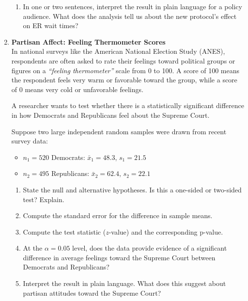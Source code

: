 \documentclass{article}
\begin{document}
\begin{enumerate}
\begin{enumerate}[label=(\alph*)]
          \item In one or two sentences, interpret the result in plain language for a policy audience. What does the analysis tell us about the new protocol’s effect on ER wait times?
        \end{enumerate}
        
\item \textbf{Partisan Affect: Feeling Thermometer Scores} \\[0.5em]
    In national surveys like the American National Election Study (ANES), respondents are often asked to rate their feelings toward political groups or figures on a \emph{“feeling thermometer”} scale from 0 to 100. A score of 100 means the respondent feels very warm or favorable toward the group, while a score of 0 means very cold or unfavorable feelings.
    
    A researcher wants to test whether there is a statistically significant difference in how Democrats and Republicans feel about the Supreme Court.
    
    Suppose two large independent random samples were drawn from recent survey data:
    \begin{itemize}
        \item $n_1 = 520$ Democrats: $\bar{x}_1 = 48.3$, $s_1 = 21.5$
        \item $n_2 = 495$ Republicans: $\bar{x}_2 = 62.4$, $s_2 = 22.1$
    \end{itemize}
    
    \begin{enumerate}[label=(\alph*)]
        \item State the null and alternative hypotheses. Is this a one-sided or two-sided test? Explain.
        \item Compute the standard error for the difference in sample means.
        \item Compute the test statistic ($z$-value) and the corresponding p-value.
        \item At the $\alpha = 0.05$ level, does the data provide evidence of a significant difference in average feelings toward the Supreme Court between Democrats and Republicans?
        \item Interpret the result in plain language. What does this suggest about partisan attitudes toward the Supreme Court?
    \end{enumerate}
    
\end{enumerate}
\end{document}
